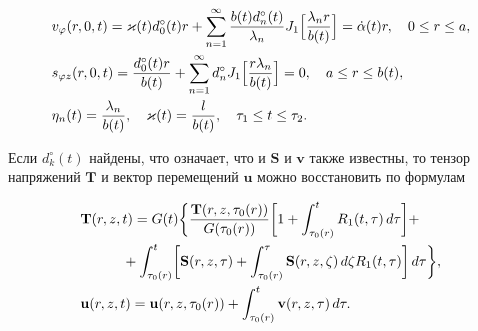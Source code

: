\begin{align}\label{Manzh_eq_12}%

\hskip-5em

\begin{aligned}

  &

  v_\varphi(r,0,t)=\varkappa(t)d_0^\circ(t)r

  +\sum_{n=1}^\infty \frac{b(t)d_n^\circ(t)}{\lambda_n}J_1\Bigl[\frac{\lambda_nr}{b(t)}\Bigr]=\dot\alpha(t)r,

\quad 

  0\leq r\leq a,

\\

  &

  s_{\varphi z}(r,0,t)=\frac{d_0^\circ(t)r}{b(t)}

  +\sum_{n=1}^\infty d_n^\circ J_1\Bigl[\frac{r\lambda_n}{b(t)}\Bigr]=0,

\quad    a\leq r\leq b(t),

\\

  &

  \eta_n(t)=\frac{\lambda_n}{b(t)},\quad

  \varkappa(t)=\frac{l}{b(t)},\quad

  \tau_1\leq t\leq\tau_2.

\end{aligned}

\hskip-5em

\end{align}



Если $d_k^\circ(t)$ найдены, что означает, что и $\mathbf S$ и $\mathbf v$ также известны, то тензор напряжений $\mathbf T$ и вектор перемещений $\mathbf u$ можно восстановить по формулам

\begin{align}\label{Manzh_eq_13}%

\hskip-5em

\begin{aligned}

  &

  \mathbf T(r,z,t)=G(t)\biggl\{\frac{\mathbf T(r,z,\tau_0(r))}{G(\tau_0(r))}\biggl[1+\int_{\tau_0(r)}^t  R_1(t,\tau)\,d\tau\biggr] +

\\

  &

  \hskip3em

  + \int_{\tau_0(r)}^t \biggl[\mathbf S(r,z,\tau) + \int_{\tau_0(r)}^\tau  \mathbf S(r,z,\zeta)\,d\zeta R_1(t,\tau)\biggr]\,d\tau\biggr\},

\\

  &

  \mathbf u(r,z,t)=\mathbf u(r,z,\tau_0(r))+\int_{\tau_0(r)}^t\mathbf v(r,z,\tau)\,d\tau.

\end{aligned}

\hskip-5em

\end{align}



